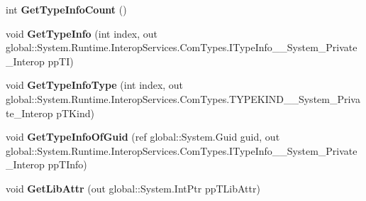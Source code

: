 \begin{DoxyCompactItemize}
\item 
\mbox{\label{interface_system_1_1_runtime_1_1_interop_services_1_1_com_types_1_1_i_type_lib_____system___private___interop_a2698e0279128bfafc4c5f48be7a1e066}} 
int {\bfseries Get\+Type\+Info\+Count} ()
\item 
\mbox{\label{interface_system_1_1_runtime_1_1_interop_services_1_1_com_types_1_1_i_type_lib_____system___private___interop_a294102830607259f08459d9bd9c31d4e}} 
void {\bfseries Get\+Type\+Info} (int index, out global\+::\+System.\+Runtime.\+Interop\+Services.\+Com\+Types.\+I\+Type\+Info\+\_\+\+\_\+\+System\+\_\+\+Private\+\_\+\+Interop pp\+TI)
\item 
\mbox{\label{interface_system_1_1_runtime_1_1_interop_services_1_1_com_types_1_1_i_type_lib_____system___private___interop_a986454fa9fc37dfd64ab594c0fc42232}} 
void {\bfseries Get\+Type\+Info\+Type} (int index, out global\+::\+System.\+Runtime.\+Interop\+Services.\+Com\+Types.\+T\+Y\+P\+E\+K\+I\+N\+D\+\_\+\+\_\+\+System\+\_\+\+Private\+\_\+\+Interop p\+T\+Kind)
\item 
\mbox{\label{interface_system_1_1_runtime_1_1_interop_services_1_1_com_types_1_1_i_type_lib_____system___private___interop_a29c3f76d3f2e6750db6203a42ad93a69}} 
void {\bfseries Get\+Type\+Info\+Of\+Guid} (ref global\+::\+System.\+Guid guid, out global\+::\+System.\+Runtime.\+Interop\+Services.\+Com\+Types.\+I\+Type\+Info\+\_\+\+\_\+\+System\+\_\+\+Private\+\_\+\+Interop pp\+T\+Info)
\item 
\mbox{\label{interface_system_1_1_runtime_1_1_interop_services_1_1_com_types_1_1_i_type_lib_____system___private___interop_ac1b35c8576242797a74466d7999c3d30}} 
void {\bfseries Get\+Lib\+Attr} (out global\+::\+System.\+Int\+Ptr pp\+T\+Lib\+Attr)

\end{DoxyCompactItemize}

